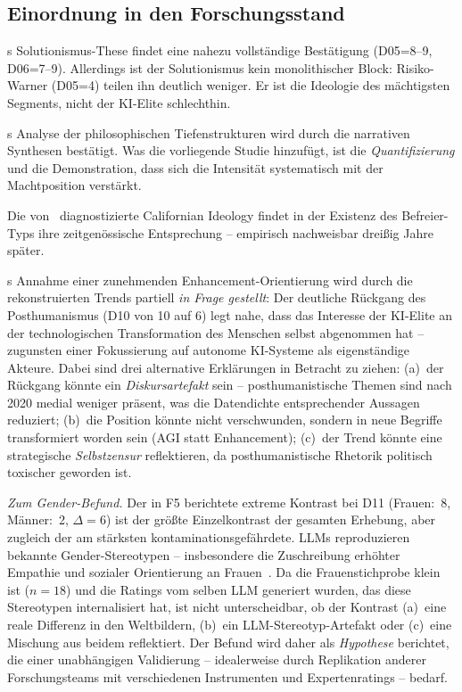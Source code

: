 \documentclass[12pt,a4paper]{article}
\begin{document}
\subsection{Einordnung in den Forschungsstand}
\label{sec:diskussion:einordnung}

\citeauthor{Morozov2013}s Solutionismus-These findet eine nahezu vollständige Bestätigung (D05=8--9, D06=7--9). Allerdings ist der Solutionismus kein monolithischer Block: Risiko-Warner (D05=4) teilen ihn deutlich weniger. Er ist die Ideologie des mächtigsten Segments, nicht der KI-Elite schlechthin.

\citeauthor{Daub2020}s Analyse der philosophischen Tiefenstrukturen wird durch die narrativen Synthesen bestätigt. Was die vorliegende Studie hinzufügt, ist die \emph{Quantifizierung} und die Demonstration, dass sich die Intensität systematisch mit der Machtposition verstärkt.

Die von~\citet{BarbCam1996} diagnostizierte Californian Ideology findet in der Existenz des Befreier-Typs ihre zeitgenössische Entsprechung -- empirisch nachweisbar dreißig Jahre später.

\citeauthor{Coeckelbergh2020}s Annahme einer zunehmenden Enhancement-Orientierung wird durch die rekonstruierten Trends partiell \emph{in Frage gestellt}: Der deutliche Rückgang des Posthumanismus (D10 von 10 auf 6) legt nahe, dass das Interesse der KI-Elite an der technologischen Transformation des Menschen selbst abgenommen hat -- zugunsten einer Fokussierung auf autonome KI-Systeme als eigenständige Akteure. Dabei sind drei alternative Erklärungen in Betracht zu ziehen: (a)~der Rückgang könnte ein \emph{Diskursartefakt} sein -- posthumanistische Themen sind nach 2020 medial weniger präsent, was die Datendichte entsprechender Aussagen reduziert; (b)~die Position könnte nicht verschwunden, sondern in neue Begriffe transformiert worden sein (\glqq AGI\grqq{} statt \glqq Enhancement\grqq); (c)~der Trend könnte eine strategische \emph{Selbstzensur} reflektieren, da posthumanistische Rhetorik politisch toxischer geworden ist.

\emph{Zum Gender-Befund.} Der in F5 berichtete extreme Kontrast bei D11 (Frauen:~8, Männer:~2, $\Delta = 6$) ist der größte Einzelkontrast der gesamten Erhebung, aber zugleich der am stärksten kontaminationsgefährdete. LLMs reproduzieren bekannte Gender-Stereotypen -- insbesondere die Zuschreibung erhöhter Empathie und sozialer Orientierung an Frauen~\citep{Santurkar2023}. Da die Frauenstichprobe klein ist ($n = 18$) und die Ratings vom selben LLM generiert wurden, das diese Stereotypen internalisiert hat, ist nicht unterscheidbar, ob der Kontrast (a)~eine reale Differenz in den Weltbildern, (b)~ein LLM-Stereotyp-Artefakt oder (c)~eine Mischung aus beidem reflektiert. Der Befund wird daher als \emph{Hypothese} berichtet, die einer unabhängigen Validierung -- idealerweise durch Replikation anderer Forschungsteams mit verschiedenen Instrumenten und Expertenratings -- bedarf.
\end{document}
